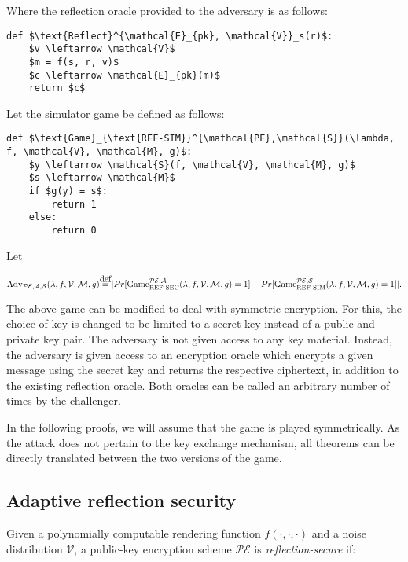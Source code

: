 \documentclass{article}
\newcommand\defeq{\stackrel{\mathclap{\normalfont\mbox{def}}}{=}}
\begin{document}
Where the reflection oracle provided to the adversary is as follows:

\begin{lstlisting}[texcl,mathescape]
def $\text{Reflect}^{\mathcal{E}_{pk}, \mathcal{V}}_s(r)$:
    $v \leftarrow \mathcal{V}$
    $m = f(s, r, v)$
    $c \leftarrow \mathcal{E}_{pk}(m)$
    return $c$
\end{lstlisting}

Let the simulator game be defined as follows:

\begin{lstlisting}[texcl,mathescape]
def $\text{Game}_{\text{REF-SIM}}^{\mathcal{PE},\mathcal{S}}(\lambda, f, \mathcal{V}, \mathcal{M}, g)$:
    $y \leftarrow \mathcal{S}(f, \mathcal{V}, \mathcal{M}, g)$
    $s \leftarrow \mathcal{M}$
    if $g(y) = s$:
        return 1
    else:
        return 0
\end{lstlisting}

Let

\begin{equation*}
    \text{Adv}_{\mathcal{PE}, \mathcal{A}, \mathcal{S}}(\lambda, f, \mathcal{V}, \mathcal{M}, g)
    \defeq
    |Pr[\text{Game}_{\text{REF-SEC}}^{\mathcal{PE},\mathcal{A}}(\lambda, f, \mathcal{V}, \mathcal{M}, g) = 1]
    -
    Pr[\text{Game}_{\text{REF-SIM}}^{\mathcal{PE},\mathcal{S}}(\lambda, f, \mathcal{V}, \mathcal{M}, g) = 1]|.
\end{equation*}

The above game can be modified to deal with symmetric encryption. For this, the
choice of key is changed to be limited to a secret key instead of a public and
private key pair. The adversary is not given access to any key material.
Instead, the adversary is given access to an encryption oracle which encrypts a
given message using the secret key and returns the respective ciphertext, in
addition to the existing reflection oracle. Both oracles can be called an
arbitrary number of times by the challenger.

In the following proofs, we will assume that the game is played symmetrically.
As the attack does not pertain to the key exchange mechanism, all theorems can
be directly translated between the two versions of the game.

\subsection{Adaptive reflection security}

Given a polynomially computable rendering function $f(\cdot, \cdot, \cdot)$ and
a  noise distribution $\mathcal{V}$, a public-key encryption scheme
$\mathcal{PE}$ is \textit{reflection-secure} if:
\end{document}
